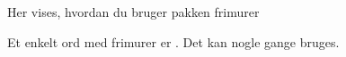\documentclass{article}
\begin{document}
\begin{frimurer}
Her vises, hvordan du bruger pakken frimurer
\end{frimurer}

Et enkelt ord med frimurer er .
Det kan nogle gange bruges.
\end{document}

